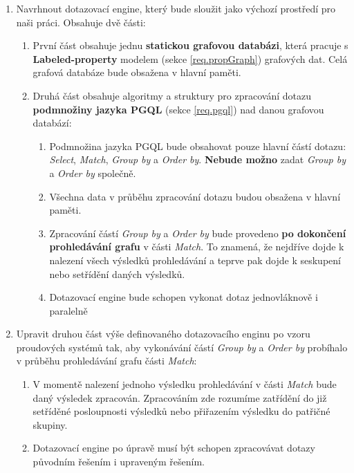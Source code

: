 \begin{enumerate}
\item
Navrhnout dotazovací engine, který bude sloužit jako výchozí prostředí pro naši práci.
Obsahuje dvě části:
\begin{enumerate}
\item První část obsahuje jednu \textbf{statickou grafovou databázi}, která pracuje s \textbf{Labeled-property} modelem (sekce \ref{req.propGraph}) grafových dat.
Celá grafová databáze bude obsažena v hlavní paměti.

\item Druhá část obsahuje algoritmy a struktury pro zpracování dotazu \textbf{podmnožiny jazyka PGQL} (sekce \ref{req.pgql}) nad danou grafovou databází:
    \begin{enumerate}
    \item Podmnožina jazyka PGQL bude obsahovat pouze hlavní částí dotazu: \textit{Select}, \textit{Match}, \textit{Group by} a \textit{Order by}.
    \textbf{Nebude možno} zadat \textit{Group by} a \textit{Order by} společně.
    \item Všechna data v průběhu zpracování dotazu budou obsažena v hlavní paměti.
    \item Zpracování částí \textit{Group by} a \textit{Order by} bude provedeno \textbf{po dokončení prohledávání grafu} v části \textit{Match}.
    To znamená, že nejdříve dojde k nalezení všech výsledků prohledávání a teprve pak dojde k seskupení nebo setřídění daných výsledků.
    \item Dotazovací engine bude schopen vykonat dotaz jednovláknově i paralelně
    \end{enumerate}
\end{enumerate}

\item
Upravit druhou část výše definovaného dotazovacího enginu po vzoru proudových systémů tak, aby vykonávání částí \textit{Group by} a \textit{Order by} probíhalo v průběhu prohledávání grafu části \textit{Match}:
\begin{enumerate}

\item
V momentě nalezení jednoho výsledku prohledávání v části \textit{Match} bude daný výsledek zpracován.
Zpracováním zde rozumíme zatřídění do již setříděné posloupnosti výsledků nebo přiřazením výsledku do patřičné skupiny.

\item 
Dotazovací engine po úpravě musí být schopen zpracovávat dotazy původním řešením i upraveným řešením.


\end{enumerate}
\end{enumerate}
